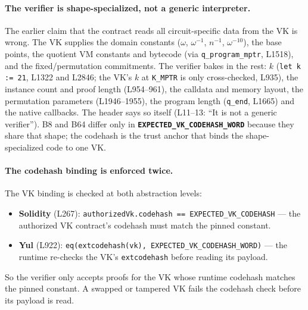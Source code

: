 \paragraph{The verifier is shape-specialized, not a generic interpreter.}
 The earlier claim that the contract reads all
circuit-specific data from the VK is wrong. The VK supplies the
domain constants ($\omega$, $\omega^{-1}$, $n^{-1}$, $\omega^{-10}$),
the base points, the quotient VM constants and bytecode (via
\texttt{q\_program\_mptr}, L1518), and the fixed/permutation
commitments. The verifier bakes in the rest: $k$ (\texttt{let k :=
21}, L1322 and L2846; the VK's $k$ at \texttt{K\_MPTR} is only
cross-checked, L935), the instance count and proof length
(L954--961), the calldata and memory layout, the permutation
parameters (L1946--1955), the program length (\texttt{q\_end},
L1665) and the native callbacks. The header says so itself
(L11--13: ``It is not a generic verifier''). B8 and B64 differ only
in \textbf{\texttt{EXPECTED\_\allowbreak{}VK\_\allowbreak{}CODEHASH\_\allowbreak{}WORD}} because they share
that shape; the codehash is the trust anchor that binds the
shape-specialized code to one VK.

\paragraph{The codehash binding is enforced twice.}
The VK binding is checked at both abstraction levels:
\begin{itemize}[leftmargin=1.4em,itemsep=2pt]
\item \textbf{Solidity} (L267):
  \texttt{authorizedVk.codehash == EXPECTED\_\allowbreak{}VK\_\allowbreak{}CODEHASH} ---
  the authorized VK contract's codehash must match the pinned
  constant.
\item \textbf{Yul} (L922):
  \texttt{eq(extcodehash(vk), EXPECTED\_\allowbreak{}VK\_\allowbreak{}CODEHASH\_\allowbreak{}WORD)} ---
  the runtime re-checks the VK's \texttt{extcodehash} before
  reading its payload.
\end{itemize}
So the verifier only accepts proofs for the VK whose
runtime codehash matches the pinned constant. A swapped or
tampered VK fails the codehash check before its payload is read.

